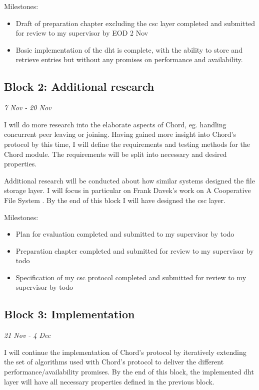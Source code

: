\documentclass[12pt]{article}
\begin{document}
Milestones:
\begin{itemize}
\item{Draft of preparation chapter excluding the \gls{csc} layer completed and submitted for review to my supervisor by EOD 2 Nov}
\item{Basic implementation of the \gls{dht} is complete, with the ability to store and retrieve entries but without any promises on performance and availability.}
\end{itemize}


\subsection{Block 2: Additional research}
\emph{7 Nov - 20 Nov}  %

I will do more research into the elaborate aspects of Chord, eg. handling concurrent peer leaving or joining. Having gained more insight into Chord's protocol by this time, I will define the requirements and testing methods for the Chord module. The requirements will be split into necessary and desired properties.

Additional research will be conducted about how similar systems designed the file storage layer. I will focus in particular on Frank Davek's work on A Cooperative File System \cite{dabekcfs}. By the end of this block I will have designed the \gls{csc} layer.

Milestones:
\begin{itemize}
\item{Plan for evaluation completed and submitted to my supervisor by todo}
\item{Preparation chapter completed and submitted for review to my supervisor by todo}
\item{Specification of my \gls{csc} protocol completed and submitted for review to my supervisor by todo}
\end{itemize}


\subsection{Block 3: Implementation}
\emph{21 Nov - 4 Dec}  %

I will continue the implementation of Chord's protocol by iteratively extending the set of algorithms used with Chord's protocol to deliver the different performance/availability promises. By the end of this block, the implemented \gls{dht} layer will have all necessary properties defined in the previous block.
\end{document}
